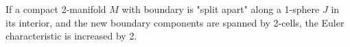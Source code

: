 If a compact 2-manifold $M$ with boundary is "split apart" along a 1-sphere $J$ in its interior, and the new boundary components are spanned by 2-cells, the Euler characteristic is increased by 2.
